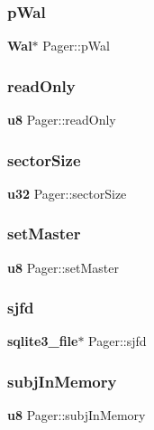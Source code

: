 \subsubsection{pWal}
{\footnotesize\ttfamily \textbf{ Wal}$\ast$ Pager\+::p\+Wal}

\mbox{\label{struct_pager_ad7a7013309fd80a2a01844e69e8e7398}} 
\subsubsection{readOnly}
{\footnotesize\ttfamily \textbf{ u8} Pager\+::read\+Only}

\mbox{\label{struct_pager_a4a47c73d7c18b803df33ba6c39baa5bf}} 
\subsubsection{sectorSize}
{\footnotesize\ttfamily \textbf{ u32} Pager\+::sector\+Size}

\mbox{\label{struct_pager_acd7eae0587c98ac41afab04e4b5defcb}} 
\subsubsection{setMaster}
{\footnotesize\ttfamily \textbf{ u8} Pager\+::set\+Master}

\mbox{\label{struct_pager_a8196bcc97f184d480848895f71e080e6}} 
\subsubsection{sjfd}
{\footnotesize\ttfamily \textbf{ sqlite3\+\_\+file}$\ast$ Pager\+::sjfd}

\mbox{\label{struct_pager_a9205654b516184d84fde5c3b5f72ff77}} 
\subsubsection{subjInMemory}
{\footnotesize\ttfamily \textbf{ u8} Pager\+::subj\+In\+Memory}

\mbox{\label{struct_pager_ac7f90d27da63090369a0e44a0bceb525}} 

